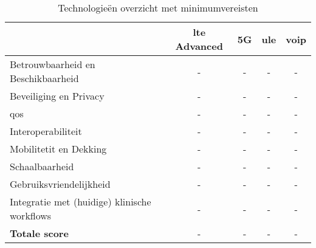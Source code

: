 \begin{table}[h!]
    \begin{center}
    \caption{Technologieën overzicht met minimumvereisten}
    \label{tab:Vergelijken van technologieën}
    \begin{tabular}{|l|c|c|c|c|}
    & \textbf{\gls{lte} Advanced} & \textbf{5G} & \textbf{\gls{ule}} & \textbf{\gls{voip}}\\
    \hline
    Betrouwbaarheid en Beschikbaarheid & - & - & - & -\\
    Beveiliging en Privacy & - & - & - & - \\
    \acrfull{qos} & - & - & - & -\\
    Interoperabiliteit & - & - & - & -\\
    Mobilitetit en Dekking & - & - & - & -\\
    Schaalbaarheid & - & - & - & -\\
    Gebruiksvriendelijkheid & - & - & - & -\\
    Integratie met (huidige) klinische workflows  & - & - & - & -\\
    \hline
    \textbf{Totale score}  & - & - & - & -\\
    \end{tabular}
    \end{center}
    \end{table}
